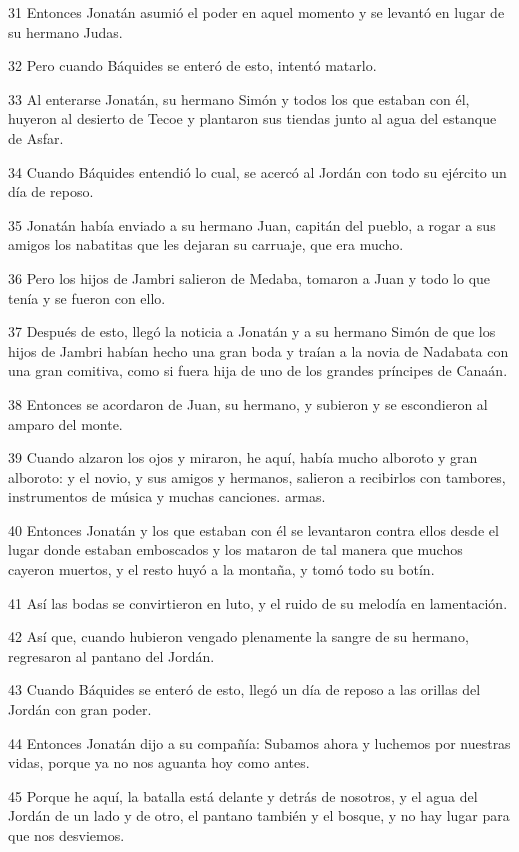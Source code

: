 \par 31 Entonces Jonatán asumió el poder en aquel momento y se levantó en lugar de su hermano Judas.
\par 32 Pero cuando Báquides se enteró de esto, intentó matarlo.
\par 33 Al enterarse Jonatán, su hermano Simón y todos los que estaban con él, huyeron al desierto de Tecoe y plantaron sus tiendas junto al agua del estanque de Asfar.
\par 34 Cuando Báquides entendió lo cual, se acercó al Jordán con todo su ejército un día de reposo.
\par 35 Jonatán había enviado a su hermano Juan, capitán del pueblo, a rogar a sus amigos los nabatitas que les dejaran su carruaje, que era mucho.
\par 36 Pero los hijos de Jambri salieron de Medaba, tomaron a Juan y todo lo que tenía y se fueron con ello.
\par 37 Después de esto, llegó la noticia a Jonatán y a su hermano Simón de que los hijos de Jambri habían hecho una gran boda y traían a la novia de Nadabata con una gran comitiva, como si fuera hija de uno de los grandes príncipes de Canaán.
\par 38 Entonces se acordaron de Juan, su hermano, y subieron y se escondieron al amparo del monte.
\par 39 Cuando alzaron los ojos y miraron, he aquí, había mucho alboroto y gran alboroto: y el novio, y sus amigos y hermanos, salieron a recibirlos con tambores, instrumentos de música y muchas canciones. armas.
\par 40 Entonces Jonatán y los que estaban con él se levantaron contra ellos desde el lugar donde estaban emboscados y los mataron de tal manera que muchos cayeron muertos, y el resto huyó a la montaña, y tomó todo su botín.
\par 41 Así las bodas se convirtieron en luto, y el ruido de su melodía en lamentación.
\par 42 Así que, cuando hubieron vengado plenamente la sangre de su hermano, regresaron al pantano del Jordán.
\par 43 Cuando Báquides se enteró de esto, llegó un día de reposo a las orillas del Jordán con gran poder.
\par 44 Entonces Jonatán dijo a su compañía: Subamos ahora y luchemos por nuestras vidas, porque ya no nos aguanta hoy como antes.
\par 45 Porque he aquí, la batalla está delante y detrás de nosotros, y el agua del Jordán de un lado y de otro, el pantano también y el bosque, y no hay lugar para que nos desviemos.

